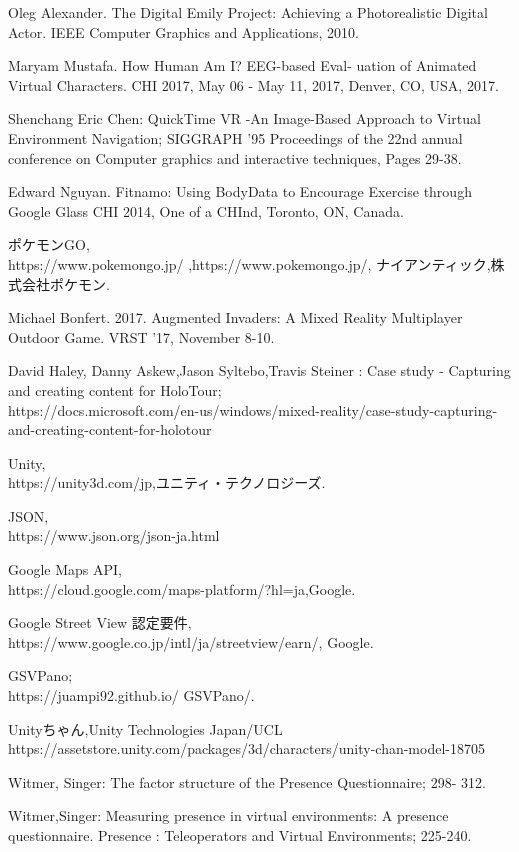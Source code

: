 \begin{thebibliography}{99}
Oleg Alexander. The Digital Emily Project: Achieving a Photorealistic Digital Actor. IEEE Computer Graphics and Applications, 2010.

Maryam Mustafa. How Human Am I? EEG-based Eval- uation of Animated Virtual Characters. CHI 2017, May 06 - May 11, 2017, Denver, CO, USA, 2017.

Shenchang Eric Chen: QuickTime VR -An Image-Based Approach to Virtual Environment Navigation; SIGGRAPH ’95 Proceedings of the 22nd annual conference on Computer graphics and interactive techniques, Pages 29-38.

 Edward Nguyan. Fitnamo: Using BodyData to Encourage Exercise through Google Glass CHI 2014, One of a CHInd, Toronto, ON, Canada.

ポケモンGO,\\
https://www.pokemongo.jp/ ,https://www.pokemongo.jp/, ナイアンティック,株式会社ポケモン.

Michael Bonfert. 2017. Augmented Invaders: A Mixed Reality Multiplayer Outdoor Game. VRST ’17, November 8-10.

David Haley, Danny Askew,Jason Syltebo,Travis Steiner : Case study - Capturing and creating content for HoloTour;\\
https://docs.microsoft.com/en-us/windows/mixed-reality/case-study-capturing-and-creating-content-for-holotour

Unity,\\
https://unity3d.com/jp,ユニティ・テクノロジーズ.


JSON,\\
https://www.json.org/json-ja.html

Google Maps API,\\
https://cloud.google.com/maps-platform/?hl=ja,Google.

Google Street View 認定要件,\\
https://www.google.co.jp/intl/ja/streetview/earn/, Google.

GSVPano;\\
https://juampi92.github.io/ GSVPano/.

Unityちゃん,Unity Technologies Japan/UCL\\
https://assetstore.unity.com/packages/3d/characters/unity-chan-model-18705

Witmer, Singer: The factor structure of the Presence Questionnaire; 298- 312.

Witmer,Singer: Measuring presence in virtual environments: A presence questionnaire. Presence : Teleoperators and Virtual Environments; 225-240.


\end{thebibliography}
